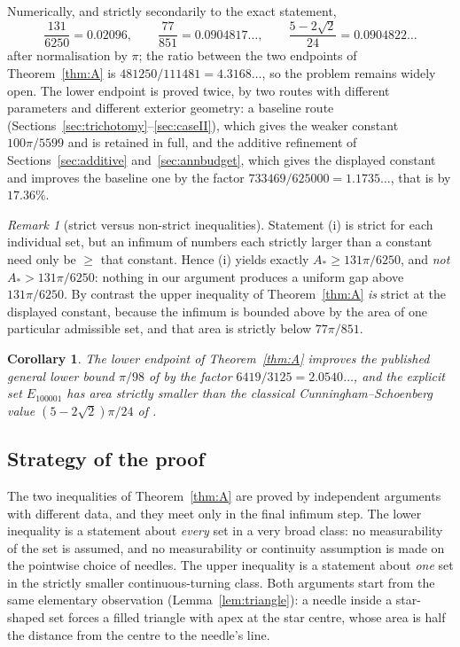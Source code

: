 \documentclass[11pt]{article}
\theoremstyle{plain}
\newtheorem{corollary}[theorem]{Corollary}
\theoremstyle{definition}
\theoremstyle{remark}
\newtheorem{remark}[theorem]{Remark}
\newcommand{\Astar}{A_{*}}
\begin{document}
Numerically, and strictly secondarily to the exact statement,
\[
  \frac{131}{6250}=0.02096,\qquad
  \frac{77}{851}=0.0904817\ldots,\qquad
  \frac{5-2\sqrt2}{24}=0.0904822\ldots
\]
after normalisation by $\pi$; the ratio between the two endpoints of
Theorem~\ref{thm:A} is $481250/111481=4.3168\ldots$, so the problem remains
widely open. The lower endpoint is proved twice, by two routes with different
parameters and different exterior geometry: a baseline route
(Sections~\ref{sec:trichotomy}--\ref{sec:caseII}), which gives the weaker
constant $100\pi/5599$ and is retained in full, and the additive refinement of
Sections~\ref{sec:additive} and~\ref{sec:annbudget}, which gives the displayed
constant and improves the baseline one by the factor
$733469/625000=1.1735\ldots$, that is by $17.36\%$.

\begin{remark}[strict versus non-strict inequalities]\label{rem:strict}
Statement (i) is strict for each individual set, but an infimum of numbers each
strictly larger than a constant need only be $\ge$ that constant. Hence (i)
yields exactly $\Astar\ge131\pi/6250$, and \emph{not}
$\Astar>131\pi/6250$: nothing in our argument produces a uniform gap above
$131\pi/6250$. By contrast the upper inequality of Theorem~\ref{thm:A}
\emph{is} strict at the displayed constant, because the infimum is bounded above
by the area of one particular admissible set, and that area is strictly below
$77\pi/851$.
\end{remark}

\begin{corollary}\label{cor:historical}
The lower endpoint of Theorem~\ref{thm:A} improves the published general lower
bound $\pi/98$ of \cite{Li2026} by the factor $6419/3125=2.0540\ldots$, and the
explicit set $E_{100001}$ has area strictly smaller than the classical
Cunningham--Schoenberg value $(5-2\sqrt2)\pi/24$ of
\cite{CunninghamSchoenberg1965}.
\end{corollary}

\subsection{Strategy of the proof}\label{sec:strategy}

The two inequalities of Theorem~\ref{thm:A} are proved by independent arguments
with different data, and they meet only in the final infimum step. The lower
inequality is a statement about \emph{every} set in a very broad class: no
measurability of the set is assumed, and no measurability or continuity
assumption is made on the pointwise choice of needles. The upper inequality is a
statement about \emph{one} set in the strictly smaller continuous-turning
class.
Both arguments start from the same elementary observation
(Lemma~\ref{lem:triangle}): a needle inside a star-shaped set forces a filled
triangle with apex at the star centre, whose area is half the distance from the
centre to the needle's line.
\end{document}
